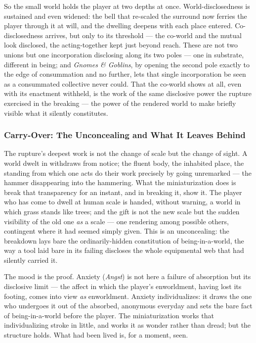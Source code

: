 \documentclass{article}
\begin{document}
So the small world holds the player at two depths at once. World-disclosedness is sustained and even widened: the bell that re-scaled the surround now ferries the player through it at will, and the dwelling deepens with each place entered. Co-disclosedness arrives, but only to its threshold — the co-world and the mutual look disclosed, the acting-together kept just beyond reach. These are not two unions but one incorporation disclosing along its two poles — one in substrate, different in being; and \textit{Gnomes \& Goblins}, by opening the second pole exactly to the edge of consummation and no further, lets that single incorporation be seen as a consummated collective never could. That the co-world shows at all, even with its enactment withheld, is the work of the same disclosive power the rupture exercised in the breaking — the power of the rendered world to make briefly visible what it silently constitutes.

\subsubsection*{Carry-Over: The Unconcealing and What It Leaves Behind}

The rupture's deepest work is not the change of scale but the change of sight. A world dwelt in withdraws from notice; the fluent body, the inhabited place, the standing from which one acts do their work precisely by going unremarked — the hammer disappearing into the hammering. What the miniaturization does is break that transparency for an instant, and in breaking it, show it. The player who has come to dwell at human scale is handed, without warning, a world in which grass stands like trees; and the gift is not the new scale but the sudden visibility of the old one \textit{as} a scale — one rendering among possible others, contingent where it had seemed simply given. This is an unconcealing: the breakdown lays bare the ordinarily-hidden constitution of being-in-a-world, the way a tool laid bare in its failing discloses the whole equipmental web that had silently carried it.

The mood is the proof. Anxiety (\textit{Angst}) is not here a failure of absorption but its disclosive limit — the affect in which the player's enworldment, having lost its footing, comes into view \textit{as} enworldment. Anxiety individualizes: it draws the one who undergoes it out of the absorbed, anonymous everyday and sets the bare fact of being-in-a-world before the player. The miniaturization works that individualizing stroke in little, and works it as wonder rather than dread; but the structure holds. What had been lived is, for a moment, seen.
\end{document}
